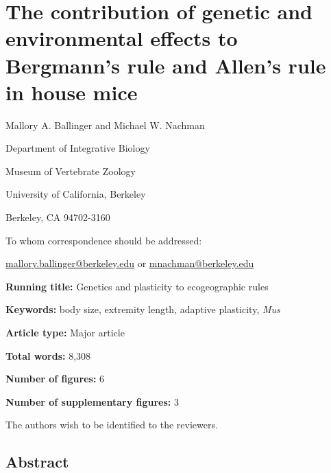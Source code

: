 \documentclass[]{article}
\author{}
\date{\vspace{-2.5em}}
\begin{document}
\hypertarget{the-contribution-of-genetic-and-environmental-effects-to-bergmanns-rule-and-allens-rule-in-house-mice}{%
\section{The contribution of genetic and environmental effects to
Bergmann's rule and Allen's rule in house
mice}\label{the-contribution-of-genetic-and-environmental-effects-to-bergmanns-rule-and-allens-rule-in-house-mice}}

\vspace{20mm}

Mallory A. Ballinger and Michael W. Nachman

\vspace{20mm}

Department of Integrative Biology

Museum of Vertebrate Zoology

University of California, Berkeley

Berkeley, CA 94702-3160

\vspace{10mm}

To whom correspondence should be addressed:

\href{mailto:mallory.ballinger@berkeley.edu}{mallory.ballinger@berkeley.edu}
or \href{mailto:mnachman@berkeley.edu}{mnachman@berkeley.edu}

\vspace{30mm}

\textbf{Running title:} Genetics and plasticity to ecogeographic rules

\textbf{Keywords:} body size, extremity length, adaptive plasticity,
\emph{Mus}

\textbf{Article type:} Major article

\textbf{Total words:} 8,308

\textbf{Number of figures:} 6

\textbf{Number of supplementary figures:} 3

\vspace{5mm}

The authors wish to be identified to the reviewers.

\newpage

\hypertarget{abstract}{%
\subsection{Abstract}\label{abstract}}
\end{document}
